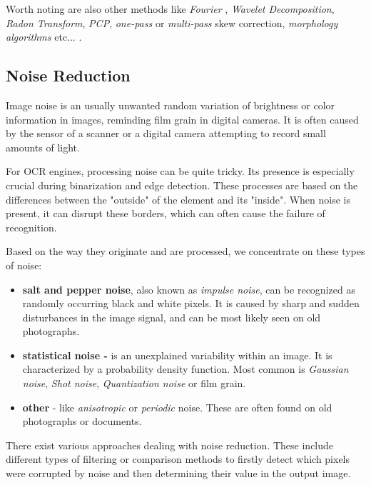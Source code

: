 Worth noting are also other methods like \emph{Fourier} \citep{fourierTransform}, \emph{Wavelet Decomposition}, \emph{Radon Transform}, \emph{PCP}, \emph{one-pass} or \emph{multi-pass} skew correction, \emph{morphology algorithms} etc... \citep{skewBestTechniques}.

\subsection{Noise Reduction}

Image noise is an usually unwanted random variation of brightness or color information in images, reminding film grain in digital cameras. It is often caused by the sensor of a scanner or a digital camera attempting to record small amounts of light. 

For OCR engines, processing noise can be quite tricky. Its presence is especially crucial during binarization and edge detection. These processes are based on the differences between the "outside" of the element and its "inside". When noise is present, it can disrupt these borders, which can often cause the failure of recognition.

Based on the way they originate and are processed, we concentrate on these types of noise:

\begin{itemize}
\item\textbf{salt and pepper noise}, also known as \emph{impulse noise}, can be recognized as randomly occurring black and white pixels. It is caused by sharp and sudden disturbances in the image signal, and can be most likely seen on old photographs.

\item\textbf{statistical noise - } is an unexplained variability within an image. It is characterized by a probability density function. Most common is \emph{Gaussian noise}, \emph{Shot noise}, \emph{Quantization noise} or film grain.

\item\textbf{other} - like \emph{anisotropic} or \emph{periodic} noise. These are often found on old photographs or documents.

\end{itemize}

There exist various approaches dealing with noise reduction. These include different types of filtering or comparison methods to firstly detect which pixels were corrupted by noise and then determining their value in the output image.

